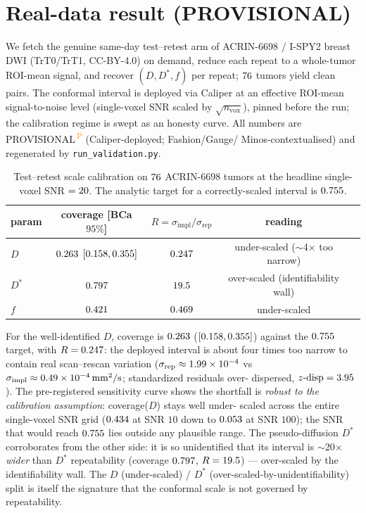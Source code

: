 \documentclass[11pt]{article}
\newcommand{\PROV}{\textsuperscript{\textcolor{orange}{\,P}}}
\newcommand{\Dstar}{D^{*}}
\newcommand{\sigimp}{\sigma_{\mathrm{impl}}}
\newcommand{\sigrep}{\sigma_{\mathrm{rep}}}
\begin{document}
\section{Real-data result (PROVISIONAL)}\label{sec:real}
We fetch the genuine same-day test--retest arm of ACRIN-6698 / I-SPY2 breast DWI
(TrT0/TrT1, CC-BY-4.0) on demand, reduce each repeat to a whole-tumor ROI-mean signal, and
recover $(D,\Dstar,f)$ per repeat; $76$ tumors yield clean pairs. The conformal interval
is deployed via Caliper at an effective ROI-mean signal-to-noise level (single-voxel SNR
scaled by $\sqrt{n_{\mathrm{vox}}}$), pinned before the run; the calibration regime is swept
as an honesty curve. All numbers are PROVISIONAL\PROV{} (Caliper-deployed; Fashion/Gauge/
Minos-contextualised) and regenerated by \texttt{run\_validation.py}.

\begin{table}[h]\centering\small
\begin{tabular}{lcccc}
\toprule
param & coverage [BCa $95\%$] & $R=\sigimp/\sigrep$ & reading \\
\midrule
$D$      & $0.263$ $[0.158,0.355]$ & $0.247$   & under-scaled ($\sim$4$\times$ too narrow) \\
$\Dstar$ & $0.797$                       & $19.5$ & over-scaled (identifiability wall) \\
$f$      & $0.421$                           & $0.469$   & under-scaled \\
\bottomrule
\end{tabular}
\caption{Test--retest scale calibration on $76$ ACRIN-6698 tumors at the headline
single-voxel SNR $=20$. The analytic target for a correctly-scaled interval is
$0.755$.}
\end{table}

For the well-identified $D$, coverage is $0.263$ ($[0.158,0.355]$) against the
$0.755$ target, with $R=0.247$: the deployed interval is about four times too narrow
to contain real scan--rescan variation ($\sigrep\approx\numSigRep\times10^{-4}$ vs
$\sigimp\approx\numSigImpl\times10^{-4}\,\mathrm{mm^2/s}$; standardized residuals over-
dispersed, $z\text{-disp}=3.95$). The pre-registered sensitivity curve shows the
shortfall is \emph{robust to the calibration assumption}: coverage($D$) stays well under-
scaled across the entire single-voxel SNR grid ($0.434$ at SNR $10$ down to
$0.053$ at SNR $100$); the SNR that would reach $0.755$ lies outside any
plausible range. The pseudo-diffusion $\Dstar$ corroborates from the other side: it is so
unidentified that its interval is $\sim$20$\times$ \emph{wider} than $\Dstar$ repeatability
(coverage $0.797$, $R=19.5$) --- over-scaled by the identifiability wall. The
$D$ (under-scaled) / $\Dstar$ (over-scaled-by-unidentifiability) split is itself the
signature that the conformal scale is not governed by repeatability.
\end{document}
